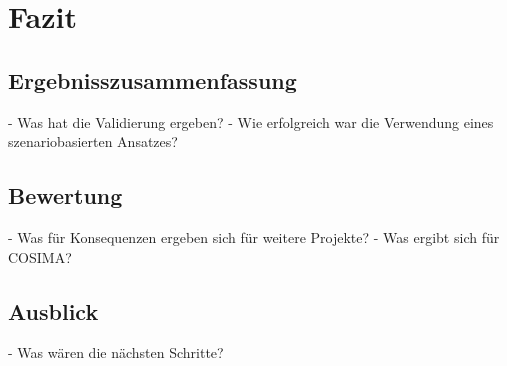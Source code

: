 \chapter{Fazit} %
\label{cha:fazit}

\section{Ergebnisszusammenfassung} %
\label{sec:ergebnisszusammenfassung}

  - Was hat die Validierung ergeben?
  - Wie erfolgreich war die Verwendung eines szenariobasierten Ansatzes?


\section{Bewertung} %
\label{sec:bewertung}

- Was für Konsequenzen ergeben sich für weitere Projekte?
- Was ergibt sich für COSIMA?


\section{Ausblick} %
\label{sec:ausblick}

  - Was wären die nächsten Schritte?


